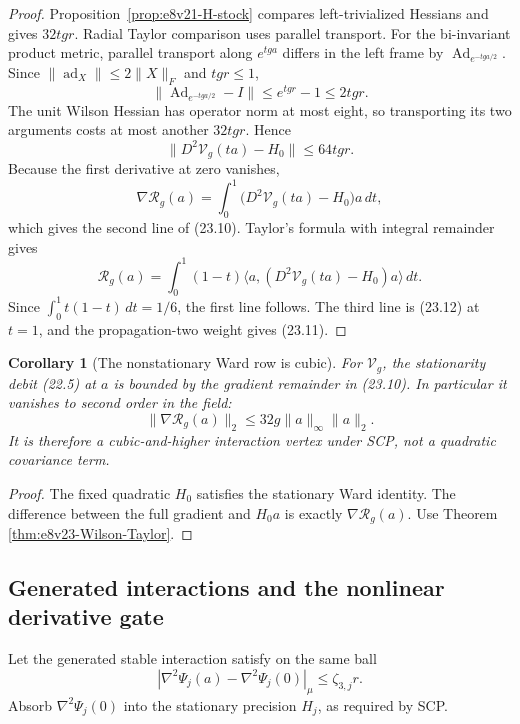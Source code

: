 \documentclass[11pt,oneside]{book}
\newtheorem{corollary}[theorem]{Corollary}
\theoremstyle{definition}
\theoremstyle{remark}
\begin{document}
\begin{proof}
Proposition~\ref{prop:e8v21-H-stock} compares left-trivialized
Hessians and gives \(32tgr\).  Radial Taylor comparison uses parallel
transport.  For the bi-invariant product metric, parallel transport
along \(e^{tga}\) differs in the left frame by
\(\operatorname{Ad}_{e^{-tga/2}}\).  Since
\(\|\operatorname{ad}_X\|\leq2\|X\|_F\) and \(tgr\leq1\),
\[
\|\operatorname{Ad}_{e^{-tga/2}}-I\|
\leq e^{tgr}-1\leq2tgr.
\]
The unit Wilson Hessian has operator norm at most eight, so transporting
its two arguments costs at most another \(32tgr\).  Hence
\[
\|D^2\mathcal V_g(ta)-H_0\|\leq64tgr.              \tag{23.12}
\]
Because the first derivative at zero vanishes,
\[
\nabla\mathcal R_g(a)
=\int_0^1\bigl(D^2\mathcal V_g(ta)-H_0\bigr)a\,dt,
\]
which gives the second line of (23.10).  Taylor's formula with integral
remainder gives
\[
\mathcal R_g(a)
=\int_0^1(1-t)
\langle a,(D^2\mathcal V_g(ta)-H_0)a\rangle\,dt.
\]
Since \(\int_0^1t(1-t)\,dt=1/6\), the first line follows.
The third line is (23.12) at \(t=1\), and the propagation-two weight
gives (23.11).
\end{proof}

\begin{corollary}[The nonstationary Ward row is cubic]
\label{cor:e8v23-Ward-cubic}
For \(\mathcal V_g\), the stationarity debit (22.5) at \(a\) is bounded
by the gradient remainder in (23.10).  In particular it vanishes to
second order in the field:
\[
\|\nabla\mathcal R_g(a)\|_2
\leq32g\|a\|_\infty\|a\|_2.                       \tag{23.13}
\]
It is therefore a cubic-and-higher interaction vertex under SCP, not
a quadratic covariance term.
\end{corollary}

\begin{proof}
The fixed quadratic \(H_0\) satisfies the stationary Ward identity.
The difference between the full gradient and \(H_0a\) is exactly
\(\nabla\mathcal R_g(a)\).  Use Theorem
\ref{thm:e8v23-Wilson-Taylor}.
\end{proof}

\subsection{Generated interactions and the nonlinear derivative gate}

Let the generated stable interaction satisfy on the same ball
\[
 |\nabla^2\Psi_j(a)-\nabla^2\Psi_j(0)|_\mu
 \leq\zeta_{3,j}r.                                  \tag{23.14}
\]
Absorb \(\nabla^2\Psi_j(0)\) into the stationary precision \(H_j\), as
required by SCP.
\end{document}
